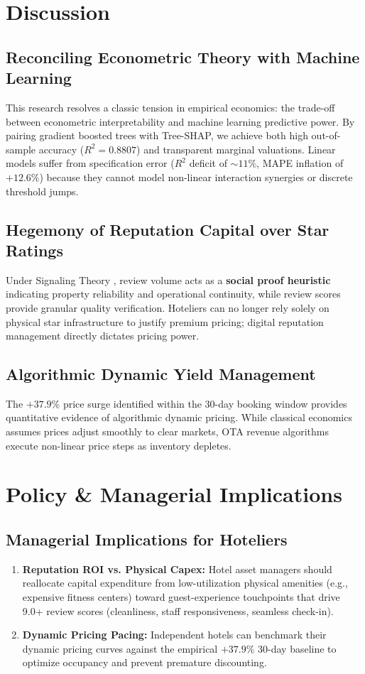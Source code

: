 \documentclass[11pt,a4paper]{article}
\begin{document}
\section{Discussion}

\subsection{Reconciling Econometric Theory with Machine Learning}
This research resolves a classic tension in empirical economics: the trade-off between econometric interpretability and machine learning predictive power. By pairing gradient boosted trees with Tree-SHAP, we achieve both high out-of-sample accuracy ($R^2 = 0.8807$) and transparent marginal valuations. Linear models suffer from specification error ($R^2$ deficit of $\sim 11\%$, MAPE inflation of $+12.6\%$) because they cannot model non-linear interaction synergies or discrete threshold jumps.

\subsection{Hegemony of Reputation Capital over Star Ratings}
Under Signaling Theory \citep{spence1973}, review volume acts as a \textbf{social proof heuristic} indicating property reliability and operational continuity, while review scores provide granular quality verification. Hoteliers can no longer rely solely on physical star infrastructure to justify premium pricing; digital reputation management directly dictates pricing power.

\subsection{Algorithmic Dynamic Yield Management}
The $+37.9\%$ price surge identified within the 30-day booking window provides quantitative evidence of algorithmic dynamic pricing. While classical economics assumes prices adjust smoothly to clear markets, OTA revenue algorithms execute non-linear price steps as inventory depletes.

\section{Policy \& Managerial Implications}

\subsection{Managerial Implications for Hoteliers}
\begin{enumerate}
    \item \textbf{Reputation ROI vs. Physical Capex:} Hotel asset managers should reallocate capital expenditure from low-utilization physical amenities (e.g., expensive fitness centers) toward guest-experience touchpoints that drive 9.0+ review scores (cleanliness, staff responsiveness, seamless check-in).
    \item \textbf{Dynamic Pricing Pacing:} Independent hotels can benchmark their dynamic pricing curves against the empirical $+37.9\%$ 30-day baseline to optimize occupancy and prevent premature discounting.
\end{enumerate}
\end{document}
